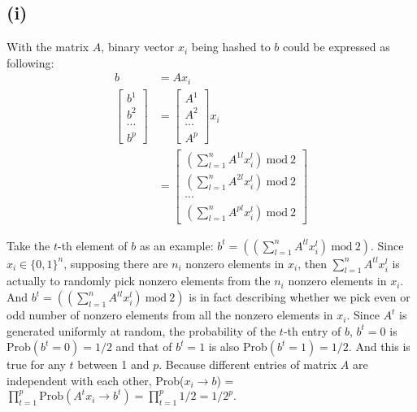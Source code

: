 \documentclass[]{homework}
\begin{document}
\subsection*{(i)}
With the matrix $A$, binary vector $x_i$ being hashed to $b$ could be expressed as following:
%
\begin{equation}
\begin{split}
b &= A x_i \\
\left[\begin{matrix} b^1 \\b^2\\ \cdots \\b^p \end{matrix} \right]&= \left[\begin{matrix} A^1  \\A^2 \\ \cdots \\A^p \end{matrix} \right]  x_i\\
&= \left[\begin{matrix} (\sum\limits_{l=1}^n A^{1l} x_i^l)\ \mathrm{mod}\ 2\\ (\sum\limits_{l=1}^n A^{2l} x_i^l)\ \mathrm{mod}\ 2\\ \cdots \\ (\sum\limits_{l=1}^n A^{pl} x_i^l)\ \mathrm{mod}\ 2 \end{matrix} \right]
\end{split}
\end{equation}

Take the $t$-th element of $b$ as an example: $b^t =  ((\sum\limits_{l=1}^n A^{tl}x_i^l)\  \mathrm{mod}\  2)$.
Since $x_i \in \{0, 1\}^n$, supposing there are $n_i$ nonzero elements in $x_i$, then $\sum\limits_{l=1}^n A^{tl} x_i^l$ is actually to randomly pick nonzero elements from the $n_i$ nonzero elements in $x_i$.
And $b^t =  ((\sum\limits_{l=1}^n A^{tl} x_i^l)\ \mathrm{mod}\ 2)$ is in fact describing whether we pick even or odd number of nonzero elements from all the nonzero elements in $x_i$.
Since $A^t$ is generated uniformly at random, the probability of the $t$-th entry of $b$, $b^t =  0$ is Prob$(b^t = 0) = 1/2$ and that of $b^t  = 1$ is also Prob$(b^t = 1) = 1/2$.
And this is true for any $t$ between 1 and $p$. 
Because different entries of matrix $A$ are independent with each other, 
Prob($x_i \rightarrow b$) = $\prod\limits_{t=1}^p \mathrm{Prob}(A^t x_i\rightarrow b^t) = \prod\limits_{t=1}^p 1/2 = 1/2^p.$
\end{document}
